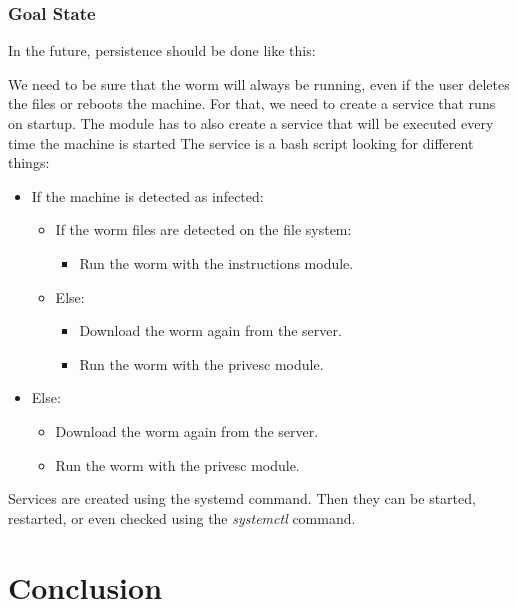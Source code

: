 
\subsubsection{Goal State}
\label{sec:goal_state}

In the future, persistence should be done like this:

We need to be sure that the worm will always be running, even if the user deletes the files or reboots the machine. For that, we need to create a service that runs on startup. The module has to also create a service that will be executed every time the machine is started The service is a bash script looking for different things:

\begin{itemize}
    \item If the machine is detected as infected:
    \begin{itemize}
        \item If the worm files are detected on the file system:
        \begin{itemize}
            \item Run the worm with the instructions module.
        \end{itemize}
        \item Else:
        \begin{itemize}
            \item Download the worm again from the server.
            \item Run the worm with the privesc module.
        \end{itemize}
    \end{itemize}
    \item Else:
    \begin{itemize}
        \item Download the worm again from the server.
        \item Run the worm with the privesc module.
    \end{itemize}
\end{itemize}

Services are created using the systemd command. Then they can be started, restarted, or even checked using the \textit{systemctl} command.


\section{Conclusion}
\label{sec:conclusion}

